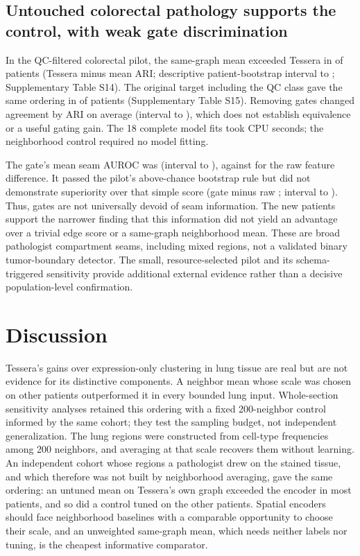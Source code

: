 \documentclass[11pt]{article}
\begin{document}
\subsection{Untouched colorectal pathology supports the control, with weak gate discrimination}
In the QC-filtered colorectal pilot, the same-graph mean exceeded Tessera in \CrcTessMeanNeg{} of \CrcPatients{} patients (Tessera minus mean \CrcTessMeanDelta{} ARI; descriptive patient-bootstrap interval \CrcTessMeanLow{} to \CrcTessMeanHigh{}; Supplementary Table S14). The original target including the QC class gave the same ordering in \CrcRawTessMeanNeg{} of \CrcPatients{} patients (Supplementary Table S15). Removing gates changed agreement by \CrcNoGateDelta{} ARI on average (interval \CrcNoGateLow{} to \CrcNoGateHigh{}), which does not establish equivalence or a useful gating gain. The 18 complete model fits took \CrcFitSeconds{} CPU seconds; the neighborhood control required no model fitting.

The gate's mean seam AUROC was \CrcGate{} (interval \CrcGateLow{} to \CrcGateHigh{}), against \CrcRaw{} for the raw feature difference. It passed the pilot's above-chance bootstrap rule but did not demonstrate superiority over that simple score (gate minus raw \CrcGateRawDelta{}; interval \CrcGateRawLow{} to \CrcGateRawHigh{}). Thus, gates are not universally devoid of seam information. The new patients support the narrower finding that this information did not yield an advantage over a trivial edge score or a same-graph neighborhood mean. These are broad pathologist compartment seams, including mixed regions, not a validated binary tumor-boundary detector. The small, resource-selected pilot and its schema-triggered sensitivity provide additional external evidence rather than a decisive population-level confirmation.


\section{Discussion}

Tessera's gains over expression-only clustering in lung tissue are real but are not evidence for its distinctive components. A neighbor mean whose scale was chosen on other patients outperformed it in every bounded lung input. Whole-section sensitivity analyses retained this ordering with a fixed 200-neighbor control informed by the same cohort; they test the sampling budget, not independent generalization. The lung regions were constructed from cell-type frequencies among 200 neighbors, and averaging at that scale recovers them without learning. An independent cohort whose regions a pathologist drew on the stained tissue, and which therefore was not built by neighborhood averaging, gave the same ordering: an untuned mean on Tessera's own graph exceeded the encoder in most patients, and so did a control tuned on the other patients. Spatial encoders should face neighborhood baselines with a comparable opportunity to choose their scale, and an unweighted same-graph mean, which needs neither labels nor tuning, is the cheapest informative comparator.
\end{document}
